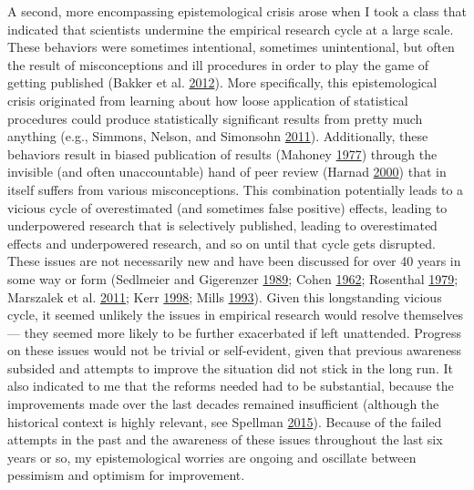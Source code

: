\documentclass[a5paper]{book}
\begin{document}
A second, more encompassing epistemological crisis arose when I took a
class that indicated that scientists undermine the empirical research
cycle at a large scale. These behaviors were sometimes intentional,
sometimes unintentional, but often the result of misconceptions and ill
procedures in order to play the game of getting published (Bakker et al.
\protect\hyperlink{ref-doi:10.1177ux2f1745691612459060}{2012}). More
specifically, this epistemological crisis originated from learning about
how loose application of statistical procedures could produce
statistically significant results from pretty much anything (e.g.,
Simmons, Nelson, and Simonsohn
\protect\hyperlink{ref-doi:10.1177ux2f0956797611417632}{2011}).
Additionally, these behaviors result in biased publication of results
(Mahoney \protect\hyperlink{ref-doi:10.1007ux2fbf01173636}{1977})
through the invisible (and often unaccountable) hand of peer review
(Harnad \protect\hyperlink{ref-cogprints1646}{2000}) that in itself
suffers from various misconceptions. This combination potentially leads
to a vicious cycle of overestimated (and sometimes false positive)
effects, leading to underpowered research that is selectively published,
leading to overestimated effects and underpowered research, and so on
until that cycle gets disrupted. These issues are not necessarily new
and have been discussed for over 40 years in some way or form (Sedlmeier
and Gigerenzer
\protect\hyperlink{ref-doi:10.1037ux2f0033-2909.105.2.309}{1989}; Cohen
\protect\hyperlink{ref-doi:10.1037ux2fh0045186}{1962}; Rosenthal
\protect\hyperlink{ref-doi:10.1037ux2f0033-2909.86.3.638}{1979};
Marszalek et al.
\protect\hyperlink{ref-doi:10.2466ux2f03.11.pms.112.2.331-348}{2011};
Kerr \protect\hyperlink{ref-doi:10.1207ux2fs15327957pspr0203_4}{1998};
Mills \protect\hyperlink{ref-doi:10.1056ux2fnejm199310143291613}{1993}).
Given this longstanding vicious cycle, it seemed unlikely the issues in
empirical research would resolve themselves --- they seemed more likely
to be further exacerbated if left unattended. Progress on these issues
would not be trivial or self-evident, given that previous awareness
subsided and attempts to improve the situation did not stick in the long
run. It also indicated to me that the reforms needed had to be
substantial, because the improvements made over the last decades
remained insufficient (although the historical context is highly
relevant, see Spellman
\protect\hyperlink{ref-doi:10.1177ux2f1745691615609918}{2015}). Because
of the failed attempts in the past and the awareness of these issues
throughout the last six years or so, my epistemological worries are
ongoing and oscillate between pessimism and optimism for improvement.
\end{document}
